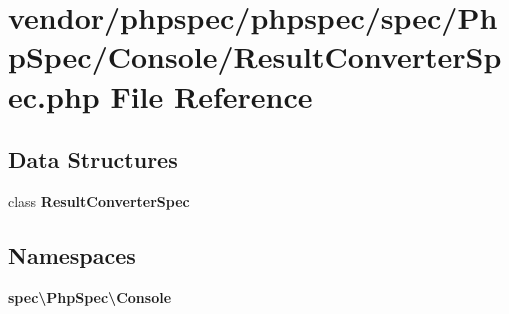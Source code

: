 \section{vendor/phpspec/phpspec/spec/\+Php\+Spec/\+Console/\+Result\+Converter\+Spec.php File Reference}
\label{_result_converter_spec_8php}
\subsection*{Data Structures}
\begin{DoxyCompactItemize}
\item 
class {\bf Result\+Converter\+Spec}
\end{DoxyCompactItemize}
\subsection*{Namespaces}
\begin{DoxyCompactItemize}
\item 
 {\bf spec\textbackslash{}\+Php\+Spec\textbackslash{}\+Console}
\end{DoxyCompactItemize}
